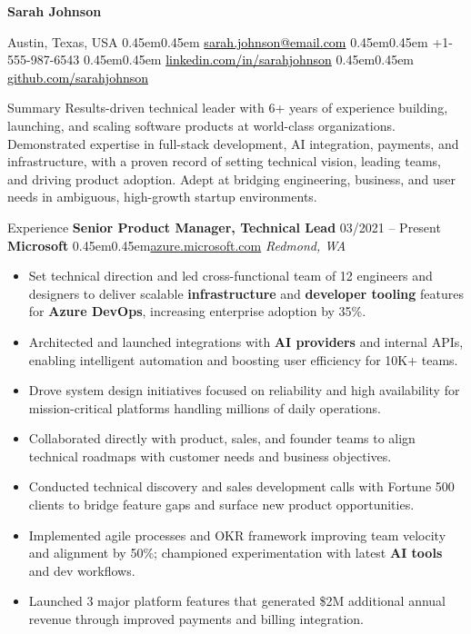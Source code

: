 \documentclass[10pt, letterpaper]{article}
\makeatletter
\renewcommand{\section}{%
  \@startsection{section}{1}{\z@}{10pt}{6pt}{%
    \Large\bfseries\color{black}%
  }%
}
\newcommand{\bull}{\kern0.45em\textbullet\kern0.45em}
\newcommand{\role}[1]{\textbf{#1}}
\newcommand{\org}[1]{\textbf{#1}}
\newcommand{\place}[1]{\textit{#1}}
\newcommand{\blackLink}[2]{\href{#1}{\textcolor{black}{#2}}}
\renewcommand{\maketitle}{
  \begin{center}
    {\huge\bfseries Sarah Johnson}\par\vspace{6pt}
    {\color{Primary}
      Austin, Texas, USA \bull
      \blackLink{mailto:sarah.johnson@email.com}{sarah.johnson@email.com} \bull
      +1-555-987-6543 \bull
      \blackLink{https://linkedin.com/in/sarahjohnson}{linkedin.com/in/sarahjohnson} \bull
      \blackLink{https://github.com/sarahjohnson}{github.com/sarahjohnson}
    }
  \end{center}
  \vspace{-8pt}
}
\makeatother
\begin{document}
\maketitle
\vspace{15pt}

\section{Summary}
Results-driven technical leader with 6+ years of experience building, launching, and scaling software products at world-class organizations. Demonstrated expertise in full-stack development, AI integration, payments, and infrastructure, with a proven record of setting technical vision, leading teams, and driving product adoption. Adept at bridging engineering, business, and user needs in ambiguous, high-growth startup environments.

\section{Experience}
\role{Senior Product Manager, Technical Lead} \hfill 03/2021 -- Present \\
\org{Microsoft} \bull \href{https://azure.microsoft.com}{azure.microsoft.com} \hfill \place{Redmond, WA}
\begin{itemize}
  \item Set technical direction and led cross-functional team of 12 engineers and designers to deliver scalable \textbf{infrastructure} and \textbf{developer tooling} features for \textbf{Azure DevOps}, increasing enterprise adoption by 35\%.
  \item Architected and launched integrations with \textbf{AI providers} and internal APIs, enabling intelligent automation and boosting user efficiency for 10K+ teams.
  \item Drove system design initiatives focused on reliability and high availability for mission-critical platforms handling millions of daily operations.
  \item Collaborated directly with product, sales, and founder teams to align technical roadmaps with customer needs and business objectives.
  \item Conducted technical discovery and sales development calls with Fortune 500 clients to bridge feature gaps and surface new product opportunities.
  \item Implemented agile processes and OKR framework improving team velocity and alignment by 50\%; championed experimentation with latest \textbf{AI tools} and dev workflows.
  \item Launched 3 major platform features that generated \$2M additional annual revenue through improved payments and billing integration.
\end{itemize}
\vspace{12pt}
\end{document}
